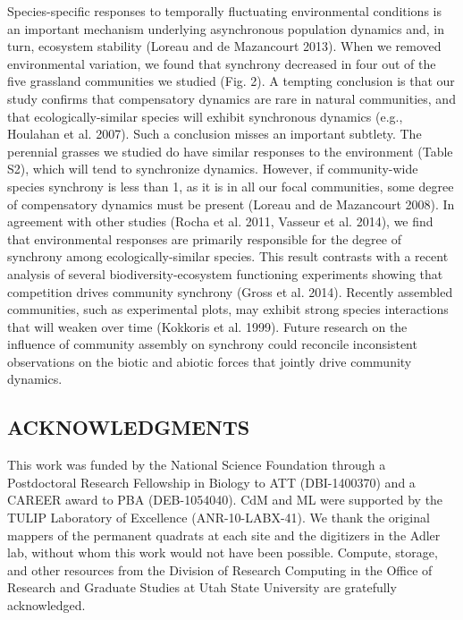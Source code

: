 \documentclass[12pt,]{article}
\begin{document}
Species-specific responses to temporally fluctuating environmental
conditions is an important mechanism underlying asynchronous population
dynamics and, in turn, ecosystem stability (Loreau and {{de Mazancourt}}
2013). When we removed environmental variation, we found that synchrony
decreased in four out of the five grassland communities we studied (Fig.
2). A tempting conclusion is that our study confirms that compensatory
dynamics are rare in natural communities, and that ecologically-similar
species will exhibit synchronous dynamics (e.g., Houlahan et al. 2007).
Such a conclusion misses an important subtlety. The perennial grasses we
studied do have similar responses to the environment (Table S2), which
will tend to synchronize dynamics. However, if community-wide species
synchrony is less than 1, as it is in all our focal communities, some
degree of compensatory dynamics must be present (Loreau and {{de
Mazancourt}} 2008). In agreement with other studies (Rocha et al. 2011,
Vasseur et al. 2014), we find that environmental responses are primarily
responsible for the degree of synchrony among ecologically-similar
species. This result contrasts with a recent analysis of several
biodiversity-ecosystem functioning experiments showing that competition
drives community synchrony (Gross et al. 2014). Recently assembled
communities, such as experimental plots, may exhibit strong species
interactions that will weaken over time (Kokkoris et al. 1999). Future
research on the influence of community assembly on synchrony could
reconcile inconsistent observations on the biotic and abiotic forces
that jointly drive community dynamics.

\subsection{ACKNOWLEDGMENTS}\label{acknowledgments}

This work was funded by the National Science Foundation through a
Postdoctoral Research Fellowship in Biology to ATT (DBI-1400370) and a
CAREER award to PBA (DEB-1054040). CdM and ML were supported by the
TULIP Laboratory of Excellence (ANR-10-LABX-41). We thank the original
mappers of the permanent quadrats at each site and the digitizers in the
Adler lab, without whom this work would not have been possible. Compute,
storage, and other resources from the Division of Research Computing in
the Office of Research and Graduate Studies at Utah State University are
gratefully acknowledged.

\setlength{\parindent}{0ex} \newpage{}
\end{document}
